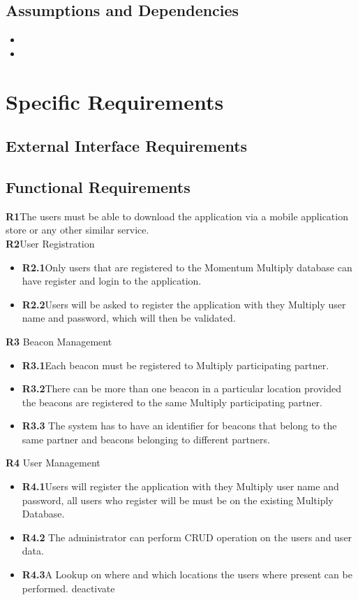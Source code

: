 \documentclass[11pt]{article}
\begin{document}
\subsection{Assumptions and Dependencies}
\begin{itemize}	
	\item 
	\item 
\end{itemize}
\section{Specific Requirements}
\subsection{External Interface Requirements}
\subsection{Functional Requirements}
\textbf{R1}The users must be able to download the application via a mobile application store or any other similar service.\\
\textbf{R2}User Registration
\begin{itemize}	
	\item \textbf{R2.1}Only users that are registered to the Momentum Multiply database can have register and login to the application.
	\item \textbf{R2.2}Users will be asked to register the application with they Multiply user name and password, which will then be validated.
\end{itemize}
\textbf{R3} Beacon Management
\begin{itemize}	
	\item \textbf{R3.1}Each beacon must be registered to Multiply participating partner.
	\item 	\textbf{R3.2}There can be more than one beacon in a particular location provided the beacons are registered to the same Multiply participating partner.
	\item \textbf{R3.3} The system has to have an identifier for beacons that belong to the same partner and beacons belonging to different partners.
	
\end{itemize}
\textbf{R4} User Management
\begin{itemize}	
	\item \textbf{R4.1}Users will register the application with they Multiply user name and password, all users who register will be must be on the existing Multiply Database. 
	\item \textbf{R4.2} The administrator can perform CRUD operation on the users and user data. 
	\item \textbf{R4.3}A Lookup on where and which locations the users where present can be performed.
	 deactivate 
\end{itemize}
\end{document}
